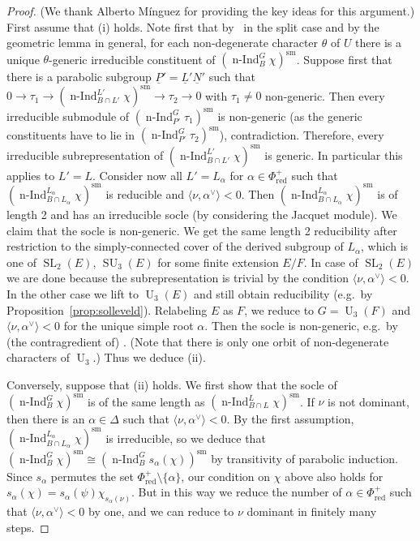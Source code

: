 \documentclass[a4paper]{amsart}
\numberwithin{equation}{section}
\theoremstyle{remark}
\theoremstyle{definition}
\DeclareMathOperator{\nInd}{n-Ind}
\DeclareMathOperator{\SL}{SL}
\DeclareMathOperator{\SU}{SU}
\DeclareMathOperator{\U}{U}
\newcommand{\sm}{\mathrm{sm}}
\newcommand{\alggrp}[1]{\underline{#1}}
\newcommand{\red}{\mathrm{red}}
\newcommand{\ang}[1]{\langle #1\rangle}
\begin{document}
\begin{proof}
  (We thank Alberto M\'inguez for providing the key ideas for this argument.)
  First assume that (i) holds.
  Note first that by~\cite[Theorem~2]{MR0354942} in the split case and by the geometric lemma \cite[5.2 Theorem]{MR0579172} in general, for each non-degenerate character $\theta$ of $U$ there is a unique $\theta$-generic irreducible constituent of $(\nInd_{B}^{G}\chi)^{\sm}$.
  Suppose first that there is a parabolic subgroup $\alggrp{P}' = \alggrp{L}'\alggrp{N}'$ such that $0 \to \tau_1 \to (\nInd_{B \cap L'}^{L'}\chi)^{\sm} \to \tau_2 \to 0$ with $\tau_1 \ne 0$ non-generic.
  Then every irreducible submodule of $(\nInd_{P'}^{G}\tau_1)^{\sm}$ is non-generic (as the generic constituents have to lie in $(\nInd_{P'}^{G}\tau_2)^{\sm}$), contradiction.
  Therefore, every irreducible subrepresentation of $(\nInd_{B \cap L'}^{L'}\chi)^{\sm}$ is generic.
  In particular this applies to $L' = L$.
  Consider now all $L' = L_\alpha$ for $\alpha \in \Phi^+_{\red}$ such that $(\nInd_{B \cap L_\alpha}^{L_\alpha} \chi)^{\sm}$ is reducible and $\ang{\nu,\alpha^\vee} < 0$.
  Then $(\nInd_{B \cap L_\alpha}^{L_\alpha} \chi)^{\sm}$ is of length 2 and has an irreducible socle (by considering the Jacquet module).
  We claim that the socle is non-generic.
  We get the same length 2 reducibility after restriction to the simply-connected cover of the derived subgroup of $L_\alpha$, which is one of $\SL_2(E)$, $\SU_3(E)$ for some finite extension $E/F$.
  In case of $\SL_2(E)$ we are done because the subrepresentation is trivial by the condition $\ang{\nu,\alpha^\vee} < 0$.
  In the other case we lift to $\U_3(E)$ and still obtain reducibility (e.g.\ by Proposition~\ref{prop:solleveld}).
  Relabeling $E$ as $F$, we reduce to $G = \U_3(F)$ and $\ang{\nu,\alpha^\vee} < 0$ for the unique simple root $\alpha$.
  Then the socle is non-generic, e.g.\ by (the contragredient of) \cite[Theorem 1]{MR1634020}.   (Note that there is only one orbit of non-degenerate characters of $\U_3$.)
  Thus we deduce (ii).
 
  Conversely, suppose that (ii) holds.
  We first show that the socle of $(\nInd_{B}^{G} \chi)^{\sm}$ is of the same length as $(\nInd_{B \cap L}^{L} \chi)^{\sm}$.
  If $\nu$ is not dominant, then there is an $\alpha \in \Delta$ such that $\ang{\nu,\alpha^\vee} < 0$.
  By the first assumption, $(\nInd_{B \cap L_\alpha}^{L_\alpha} \chi)^{\sm}$ is irreducible, so we deduce that $(\nInd_{B}^{G} \chi)^{\sm} \cong (\nInd_{B}^{G} s_\alpha(\chi))^{\sm}$ by transitivity of parabolic induction.
  Since $s_\alpha$ permutes the set $\Phi^+_{\red}\setminus\{\alpha\}$, our condition on $\chi$ above also holds for $s_\alpha(\chi) = s_\alpha(\psi)\chi_{s_\alpha(\nu)}$.
  But in this way we reduce the number of $\alpha \in \Phi^+_{\red}$ such that $\ang{\nu,\alpha^\vee} < 0$ by one, and we can reduce to $\nu$ dominant in finitely many steps.


\end{proof}
\end{document}
